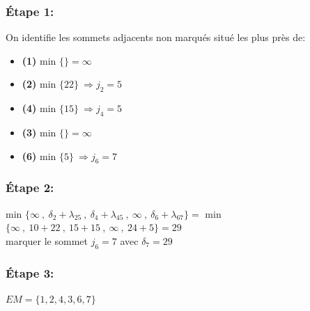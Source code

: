 \documentclass{article}
\begin{document}
\subsubsection*{Étape 1:}
On identifie les sommets adjacents non marqués situé les plus près de:
\begin{itemize}
    \item \textbf{(1)} min $\{\}=\infty$
    \item \textbf{(2)} min $\{22\}\: \Rightarrow j_2 = 5$ \\
    \item \textbf{(4)} min $\{15\}\: \Rightarrow j_4 =5$ \\
    \item \textbf{(3)} min $\{\}=\infty$
    \item \textbf{(6)} min $\{5\}\: \Rightarrow j_6 = 7$ \\
\end{itemize}
\subsubsection*{Étape 2:}
min $\{ \infty \:,\: \delta_2 +\lambda_{25} \:,\: \delta_4 + \lambda_{45} \:,\: \infty \:,\: \delta_6 + \lambda_{67}\} = $ min $\{\infty \:,\: 10+22\:,\:15+15\:,\: \infty \:,\:24+5\}=29$\\
marquer le sommet $j_6=7$ avec $\delta_7=29$ 
\subsubsection*{Étape 3:}
$EM=\{1,2,4,3,6,7\}$
\end{document}
